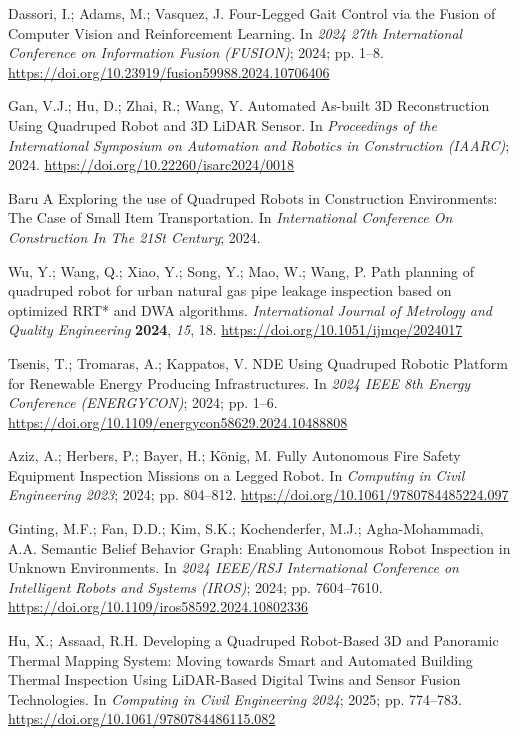Dassori, I.; Adams, M.; Vasquez, J. Four-Legged Gait Control via the Fusion of Computer Vision and Reinforcement Learning. In \emph{2024 27th International Conference on Information Fusion (FUSION)}; 2024; pp. 1--8. \url{https://doi.org/10.23919/fusion59988.2024.10706406}

Gan, V.J.; Hu, D.; Zhai, R.; Wang, Y. Automated As-built 3D Reconstruction Using Quadruped Robot and 3D LiDAR Sensor. In \emph{Proceedings of the International Symposium on Automation and Robotics in Construction (IAARC)}; 2024. \url{https://doi.org/10.22260/isarc2024/0018}

Baru A Exploring the use of Quadruped Robots in Construction Environments: The Case of Small Item Transportation. In \emph{International Conference On Construction In The 21St Century}; 2024.

Wu, Y.; Wang, Q.; Xiao, Y.; Song, Y.; Mao, W.; Wang, P. Path planning of quadruped robot for urban natural gas pipe leakage inspection based on optimized RRT* and DWA algorithms. \emph{International Journal of Metrology and Quality Engineering} \textbf{2024}, \emph{15}, 18. \url{https://doi.org/10.1051/ijmqe/2024017}

Tsenis, T.; Tromaras, A.; Kappatos, V. NDE Using Quadruped Robotic Platform for Renewable Energy Producing Infrastructures. In \emph{2024 IEEE 8th Energy Conference (ENERGYCON)}; 2024; pp. 1--6. \url{https://doi.org/10.1109/energycon58629.2024.10488808}

Aziz, A.; Herbers, P.; Bayer, H.; König, M. Fully Autonomous Fire Safety Equipment Inspection Missions on a Legged Robot. In \emph{Computing in Civil Engineering 2023}; 2024; pp. 804--812. \url{https://doi.org/10.1061/9780784485224.097}

Ginting, M.F.; Fan, D.D.; Kim, S.K.; Kochenderfer, M.J.; Agha-Mohammadi, A.A. Semantic Belief Behavior Graph: Enabling Autonomous Robot Inspection in Unknown Environments. In \emph{2024 IEEE/RSJ International Conference on Intelligent Robots and Systems (IROS)}; 2024; pp. 7604--7610. \url{https://doi.org/10.1109/iros58592.2024.10802336}

Hu, X.; Assaad, R.H. Developing a Quadruped Robot-Based 3D and Panoramic Thermal Mapping System: Moving towards Smart and Automated Building Thermal Inspection Using LiDAR-Based Digital Twins and Sensor Fusion Technologies. In \emph{Computing in Civil Engineering 2024}; 2025; pp. 774--783. \url{https://doi.org/10.1061/9780784486115.082}

